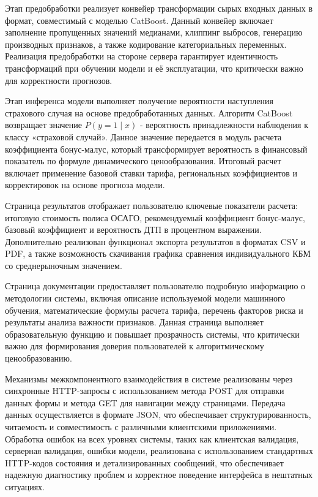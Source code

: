 Этап предобработки реализует конвейер трансформации сырых входных данных в формат, совместимый с моделью CatBoost. Данный конвейер включает заполнение пропущенных значений медианами, клиппинг выбросов, генерацию производных признаков, а также кодирование категориальных переменных. Реализация предобработки на стороне сервера гарантирует идентичность трансформаций при обучении модели и её эксплуатации, что критически важно для корректности прогнозов.

Этап инференса модели выполняет получение вероятности наступления страхового случая на основе предобработанных данных. Алгоритм CatBoost возвращает значение $P(y=1 \mid x)$ - вероятность принадлежности наблюдения к классу «страховой случай». Данное значение передается в модуль расчета коэффициента бонус-малус, который трансформирует вероятность в финансовый показатель по формуле динамического ценообразования. Итоговый расчет включает применение базовой ставки тарифа, региональных коэффициентов и корректировок на основе прогноза модели.

Страница результатов отображает пользователю ключевые показатели расчета: итоговую стоимость полиса ОСАГО, рекомендуемый коэффициент бонус-малус, базовый коэффициент и вероятность ДТП в процентном выражении. Дополнительно реализован функционал экспорта результатов в форматах CSV и PDF, а также возможность скачивания графика сравнения индивидуального КБМ со среднерыночным значением. 

Страница документации предоставляет пользователю подробную информацию о методологии системы, включая описание используемой модели машинного обучения, математические формулы расчета тарифа, перечень факторов риска и результаты анализа важности признаков. Данная страница выполняет образовательную функцию и повышает прозрачность системы, что критически важно для формирования доверия пользователей к алгоритмическому ценообразованию.

Механизмы межкомпонентного взаимодействия в системе реализованы через синхронные HTTP-запросы с использованием метода POST для отправки данных формы и метода GET для навигации между страницами. Передача данных осуществляется в формате JSON, что обеспечивает структурированность, читаемость и совместимость с различными клиентскими приложениями. Обработка ошибок на всех уровнях системы, таких как клиентская валидация, серверная валидация, ошибки модели, реализована с использованием стандартных HTTP-кодов состояния и детализированных сообщений, что обеспечивает надежную диагностику проблем и корректное поведение интерфейса в нештатных ситуациях.

